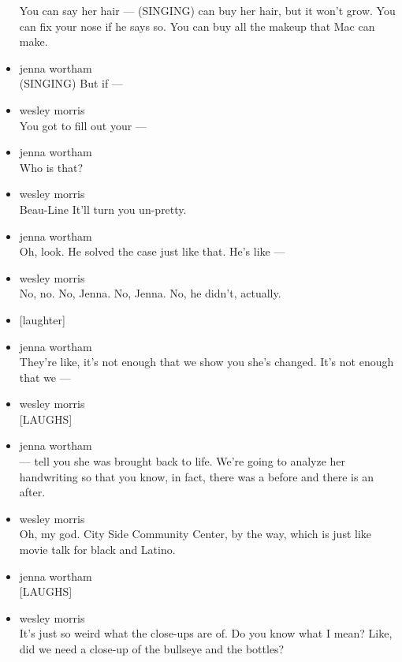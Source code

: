 \begin{itemize}
  You can say her hair --- (SINGING) can buy her hair, but it won't
  grow. You can fix your nose if he says so. You can buy all the makeup
  that Mac can make.
\item
  jenna wortham\\
  (SINGING) But if ---
\item
  wesley morris\\
  You got to fill out your ---
\item
  jenna wortham\\
  Who is that?
\item
  wesley morris\\
  Beau-Line It'll turn you un-pretty.
\item
  jenna wortham\\
  Oh, look. He solved the case just like that. He's like ---
\item
  wesley morris\\
  No, no. No, Jenna. No, Jenna. No, he didn't, actually.
\item
  {[}laughter{]}
\item
  jenna wortham\\
  They're like, it's not enough that we show you she's changed. It's not
  enough that we ---
\item
  wesley morris\\
  {[}LAUGHS{]}
\item
  jenna wortham\\
  --- tell you she was brought back to life. We're going to analyze her
  handwriting so that you know, in fact, there was a before and there is
  an after.
\item
  wesley morris\\
  Oh, my god. City Side Community Center, by the way, which is just like
  movie talk for black and Latino.
\item
  jenna wortham\\
  {[}LAUGHS{]}
\item
  wesley morris\\
  It's just so weird what the close-ups are of. Do you know what I mean?
  Like, did we need a close-up of the bullseye and the bottles?


\end{itemize}
